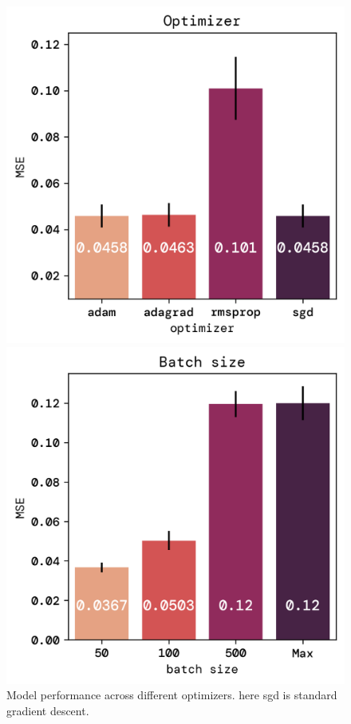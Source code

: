 \documentclass[twoside,11pt]{report}
\begin{document}
    \begin{figure}[!ht]
        \begin{minipage}[t]{0.5\textwidth - 1mm}
            \begin{center}
                \includegraphics[width=\textwidth]{../runsAndFigures/MSE_optimizer.png}
            \end{center}
            \caption
            {
                Model performance across different optimizers. here sgd is standard gradient descent.
            }\label{fig:MSE_optimizer}
        \end{minipage}
        \hspace{2mm}
        \begin{minipage}[t]{0.5\textwidth - 1mm}
            \begin{center}
                \includegraphics[width=\textwidth]{../runsAndFigures/MSE_batch.png}

\end{center}
\end{minipage}
\end{figure}
\end{document}
